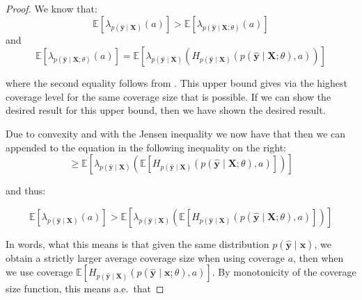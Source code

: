 \begin{proof}
    We know that:
    \begin{equation}
        \mathbb{E}\left[\lambda_{p(\mathbf{\hat{y}}\mid\mathbf{X})}(a)\right] > \mathbb{E}\left[ \lambda_{p(\mathbf{\hat{y}}\mid\mathbf{X};\theta)}( a) \right]
        \label{eq:inequality_0}
    \end{equation}
    and
    \begin{equation}
        \mathbb{E}\left[ \lambda_{p(\mathbf{\hat{y}}\mid\mathbf{X}; \theta)}( a) \right]
        =\mathbb{E}\left[ \lambda_{p(\mathbf{\hat{y}}\mid\mathbf{X})}\left(
            H_{p(\hat{\mathbf{y}}\mid \mathbf{X})}(p(\mathbf{\hat{y}}\mid \mathbf{X}; \theta), a)\right)
            \right]
        \label{eq:inequality_1}
    \end{equation}

    where the second equality follows from . This upper bound gives via  the highest coverage level for the same coverage size that is possible. If we can show the desired result for this upper bound, then we have shown the desired result.

    Due to convexity and with the Jensen inequality we now have that then we can appended to the equation in  the following inequality on the right:
    \begin{equation}
        \geq \mathbb{E}\left[ \lambda_{p(\mathbf{\hat{y}}\mid\mathbf{X})}\left(
            \mathbb{E}\left[H_{p(\hat{\mathbf{y}}\mid \mathbf{X})}(p(\mathbf{\hat{y}}\mid \mathbf{X};
                \theta), a)
                \right] \right)\right]
    \end{equation}

    and thus:

    \begin{equation}
        \mathbb{E}\left[\lambda_{p(\mathbf{\hat{y}}\mid\mathbf{X})}(a)\right]
        > \mathbb{E}\left[ \lambda_{p(\mathbf{\hat{y}}\mid\mathbf{X})}\left(
            \mathbb{E}\left[H_{p(\hat{\mathbf{y}}\mid \mathbf{X})}(p(\mathbf{\hat{y}}\mid \mathbf{X};
                \theta), a)
                \right] \right)\right]
    \end{equation}

    In words, what this means is that given the same distribution $p(\mathbf{\hat{y}}\mid\mathbf{x})$, we obtain a strictly larger average coverage size when using coverage $a$, then when we use coverage $\mathbb{E}\left[H_{p(\hat{\mathbf{y}}\mid \mathbf{X})}(p(\mathbf{\hat{y}}\mid \mathbf{x};\theta), a)\right]$. By monotonicity of the coverage size function, this means a.e.\ that


\end{proof}
